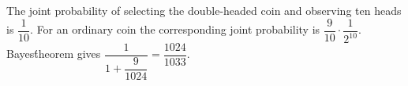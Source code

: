The joint probability of selecting the double-headed coin and observing ten heads is $\dfrac{1}{10}$. For an ordinary coin the corresponding joint probability is $\dfrac{9}{10}\cdot\dfrac{1}{2^{10}}$. Bayes\' theorem gives $\dfrac{1}{1+\dfrac{9}{1024}}=\boxed{\dfrac{1024}{1033}}$.
